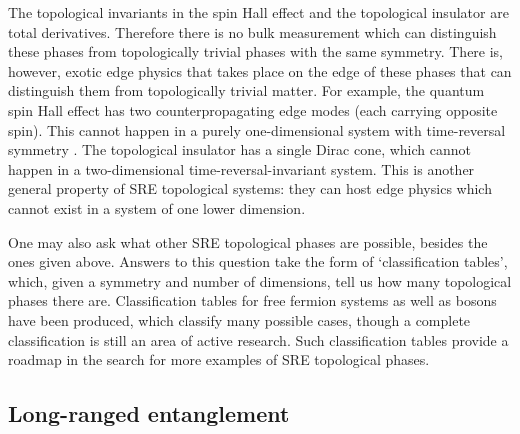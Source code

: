 The topological invariants in the spin Hall effect and the topological insulator are total derivatives. Therefore 
there is no bulk measurement which can distinguish these phases from topologically trivial phases with the same symmetry. There is, however, exotic edge physics that takes place on the edge of these phases that can distinguish them from topologically trivial matter. For example, the quantum spin Hall effect has two counterpropagating edge modes (each carrying opposite spin). This cannot happen in a purely one-dimensional system with time-reversal symmetry \cite{NielsenNinomiya}. The topological insulator has a single Dirac cone, which cannot happen in a two-dimensional time-reversal-invariant system. This is another general property of SRE topological systems: they can host edge physics which cannot exist in a system of one lower dimension.

One may also ask what other SRE topological phases are possible, besides the ones given above. Answers to this question take the form of `classification tables', which, given a symmetry and number of dimensions, tell us how many topological phases there are. Classification tables for free fermion systems\cite{KitaevClass,Ludwig} as well as bosons\cite{WenScience,WenPRB,KapustinThorngren} have been produced, which classify many possible cases, though a complete classification is still an area of active research. Such classification tables provide a roadmap in the search for more examples of SRE topological phases.

\subsection{Long-ranged entanglement}
\label{subsec::LRE}


